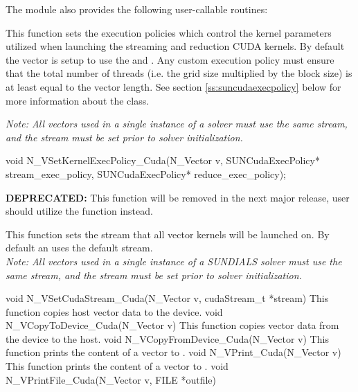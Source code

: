 The module {\nveccuda} also provides the following user-callable routines:
{
  This function sets the execution policies which control the kernel parameters
  utilized when launching the streaming and reduction CUDA kernels. By default
  the vector is setup to use the  and 
  . Any custom execution policy must ensure that
  the total number of threads (i.e. the grid size multiplied by the block size)
  is at least equal to the vector length. See section \ref{ss:suncudaexecpolicy}
  below for more information about the  class.

  \textit{Note: All vectors used in a single instance of a {\sundials} solver must
  use the same {\cuda} stream, and the {\cuda} stream must be set prior to
  solver initialization.}
}
{
  void N\_VSetKernelExecPolicy\_Cuda(N\_Vector v, 
                                    SUNCudaExecPolicy* stream\_exec\_policy,
                                    SUNCudaExecPolicy* reduce\_exec\_policy);
}
{
  \textbf{DEPRECATED:} This function will be removed in the next major release,
  user should utilize the  function instead.

  This function sets the {\cuda} stream that all vector kernels will be launched on.
  By default an {\nveccuda} uses the default {\cuda} stream.\\

  \textit{Note: All vectors used in a single instance of a SUNDIALS solver must
  use the same {\cuda} stream, and the {\cuda} stream must be set prior to
  solver initialization.}
}
{
  void N\_VSetCudaStream\_Cuda(N\_Vector v, cudaStream\_t *stream)
}
{
 This function copies host vector data to the device.
}
{
 void N\_VCopyToDevice\_Cuda(N\_Vector v)
}
{
 This function copies vector data from the device to the host.
}
{
 void N\_VCopyFromDevice\_Cuda(N\_Vector v)
}
{
  This function prints the content of a {\cuda} vector to .
}
{
  void N\_VPrint\_Cuda(N\_Vector v)
}
{
  This function prints the content of a {\cuda} vector to .
}
{
  void N\_VPrintFile\_Cuda(N\_Vector v, FILE *outfile)
}

